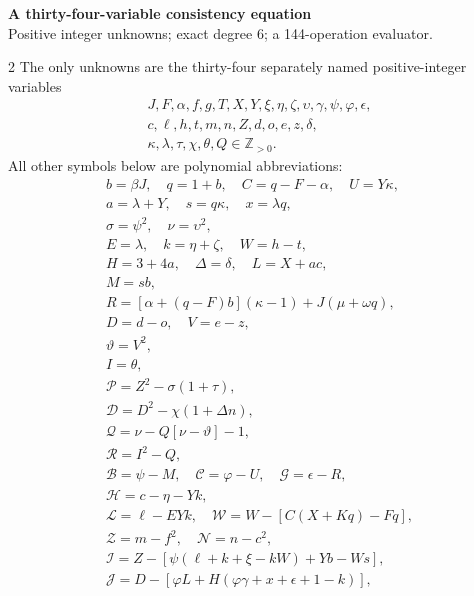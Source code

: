 \documentclass[10pt]{article}
\begin{document}
\begin{center}
{\large\bfseries A thirty-four-variable consistency equation}\\[-1pt]
{\small Positive integer unknowns; exact degree 6; a 144-operation evaluator.}
\end{center}\vspace{-8pt}
\begin{multicols}{2}
\fontsize{8.6}{9.1}\selectfont
The only unknowns are the thirty-four separately named positive-integer variables
\[
\begin{gathered}J,F,\alpha,f,g,T,X,Y,\xi,\eta,\zeta,\upsilon,\gamma,\psi,\varphi,\epsilon,\\
c,\ell,h,t,m,n,Z,d,o,e,z,\delta,\\
\kappa,\lambda,\tau,\chi,\theta,Q\in\mathbb Z_{>0}.\end{gathered}
\]
All other symbols below are polynomial abbreviations:
\[
\begin{gathered}
b=\beta J,\quad q=1+b,\quad C=q-F-\alpha,\quad U=Y\kappa,\\
a=\lambda+Y,\quad s=q\kappa,\quad x=\lambda q,\\
\sigma=\psi^2,\quad\nu=\upsilon^2,\\
E=\lambda,\quad k=\eta+\zeta,\quad W=h-t,\\
H=3+4a,\quad\Delta=\delta,\quad L=X+ac,\\
M=sb,\\
R=[\alpha+(q-F)b](\kappa-1)+J(\mu+\omega q),\\
D=d-o,\quad V=e-z,\\
\vartheta=V^2,\\
I=\theta,\\
\mathcal{P}=Z^2-\sigma(1+\tau),\\
\mathcal{D}=D^2-\chi(1+\Delta n),\\
\mathcal{Q}=\nu-Q[\nu-\vartheta]-1,\\
\mathcal{R}=I^2-Q,\\
\mathcal{B}=\psi-M,\quad \mathcal{C}=\varphi-U,\quad \mathcal{G}=\epsilon-R,\\
\mathcal{H}=c-\eta-Yk,\\
\mathcal{L}=\ell-EYk,\quad \mathcal{W}=W-[C(X+Kq)-Fq],\\
\mathcal{Z}=m-f^2,\quad \mathcal{N}=n-c^2,\\
\mathcal{I}=Z-[\psi(\ell+k+\xi-kW)+Yb-Ws],\\
\mathcal{J}=D-[\varphi L+H(\varphi\gamma+x+\epsilon+1-k)],\\

\end{gathered}\]
\end{multicols}
\end{document}

